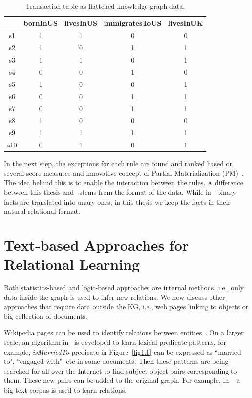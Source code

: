 \begin{table}
\begin{center}
\begin{tabular}{|c|c|c|c|c|}
\hline
 & bornInUS & livesInUS & immigratesToUS & livesInUK\\
\hline\hline
s1 & 1 & 1 & 0 & 0\\
\hline
s2 & 1 & 0 & 1 & 1\\
\hline
s3 & 1 & 1 & 0 & 1\\
\hline
s4 & 0 & 0 & 1 & 0\\
\hline
s5 & 1 & 0 & 0 & 1\\
\hline
s6 & 0 & 0 & 1 & 1\\
\hline
s7 & 0 & 0 & 1 & 1\\
\hline
s8 & 1 & 0 & 0 & 0\\
\hline
s9 & 1 & 1 & 1 & 1\\
\hline
s10 & 0 & 1 & 0 & 1\\
\hline
\end{tabular}
\end{center}
\caption{Transaction table as flattened knowledge graph data.}
\label{table2}
\end{table}

In the next step, the exceptions for each rule are found and ranked based on several score measures and innovative concept of Partial Materialization (PM)~\cite{ref12}. The idea behind this is to enable the interaction between the rules. A difference between this thesis and~\cite{ref12} stems from the format of the data. While in~\cite{ref12} binary facts are translated into unary ones, in this thesis we keep the facts in their natural relational format.

\section{Text-based Approaches for Relational Learning}

Both statistics-based and logic-based approaches are internal methods, i.e., only data inside the graph is used to infer new relations. We now discuss other approaches that require data outside the KG, i.e., web pages linking to objects or big collection of documents.

Wikipedia pages can be used to identify relations between entities~\cite{ref18}. On a larger scale, an algorithm in~\cite{ref19} is developed to learn lexical predicate patterns, for example, \textit{isMarriedTo} predicate in Figure~\ref{fig1.1} can be expressed  as ``married to", ``engaged with", etc in some documents. Then these patterns are being searched for all over the Internet to find subject-object pairs corresponding to them. These new pairs can be added to the original graph. For example, in ~\cite{ref19} a  big text corpus is used to learn relations.

